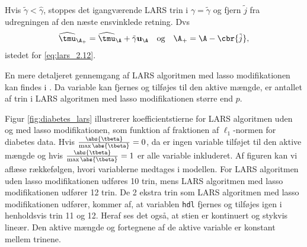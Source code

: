 %
Hvis \(\tilde{\gamma} < \widehat{\gamma}\), stoppes det igangværende LARS trin i \(\gamma = \tilde{\gamma}\) og fjern \(\tilde{j}\) fra udregningen af den næste ensvinklede retning.
Dvs
\begin{align*}
\widehat{\tmu}_{\A_+} = \widehat{\tmu}_\A + \tilde{\gamma} \mathbf{u}_\A \quad \text{og} \quad \A_+ = \A - \cbr{\tilde{j}},
\end{align*}
istedet for \eqref{eq:lars_2.12}.

En mere detaljeret gennemgang af LARS algoritmen med lasso modifikationen kan findes i \citep{efron}.
Da variable kan fjernes og tilføjes til den aktive mængde, er antallet af trin i LARS algoritmen med lasso modifikationen større end \(p\).

\begin{eks}
Figur \ref{fig:diabetes_lars} illustrerer koefficientstierne for LARS algoritmen uden og med lasso modifikationen, som funktion af fraktionen af \(\ell_1\)-normen for diabetes data.
Hvis \(\frac{\abs{\tbeta}}{\max \abs{\tbeta}} = 0\), da er ingen variable tilføjet til den aktive mængde og hvis \(\frac{\abs{\tbeta}}{\max \abs{\tbeta}} = 1\) er alle variable inkluderet.
Af figuren kan vi aflæse rækkefølgen, hvori variablerne medtages i modellen.
For LARS algoritmen uden lasso modifikationen udføres 10 trin, mens LARS algoritmen med lasso modifikationen udfører 12 trin.
De 2 ekstra trin som LARS algoritmen med lasso modifikationen udfører, kommer af, at variablen \texttt{hdl} fjernes og tilføjes igen i henholdsvis trin 11 og 12.
Heraf ses det også, at stien er kontinuert og stykvis lineær.
Den aktive mængde og fortegnene af de aktive variable er konstant mellem trinene.

\end{eks}





